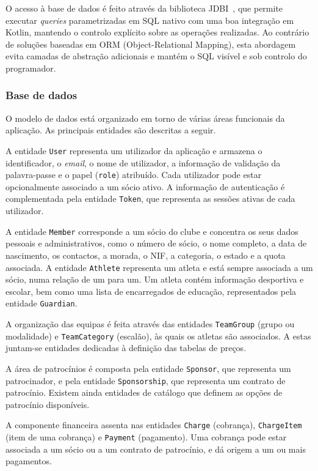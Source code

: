 O acesso à base de dados é feito através da biblioteca JDBI~\cite{jdbi}, que 
permite executar \textit{queries} parametrizadas em SQL nativo com uma boa 
integração em Kotlin, mantendo o controlo explícito sobre as operações 
realizadas. Ao contrário de soluções baseadas em ORM (Object-Relational Mapping), esta abordagem evita 
camadas de abstração adicionais e mantém o SQL visível e sob controlo do 
programador.

\subsubsection*{Base de dados}

O modelo de dados está organizado em torno de várias áreas funcionais da 
aplicação. As principais entidades são descritas a seguir.

A entidade \texttt{User} representa um utilizador da aplicação e armazena o 
identificador, o \textit{email}, o nome de utilizador, a informação de 
validação da palavra-passe e o papel (\texttt{role}) atribuído. Cada 
utilizador pode estar opcionalmente associado a um sócio ativo. A informação 
de autenticação é complementada pela entidade \texttt{Token}, que representa 
as sessões ativas de cada utilizador.

A entidade \texttt{Member} corresponde a um sócio do clube e concentra os seus 
dados pessoais e administrativos, como o número de sócio, o nome completo, a 
data de nascimento, os contactos, a morada, o NIF, a categoria, o estado e a 
quota associada. A entidade \texttt{Athlete} representa um atleta e está sempre 
associada a um sócio, numa relação de um para um. Um atleta contém informação 
desportiva e escolar, bem como uma lista de encarregados de educação, 
representados pela entidade \texttt{Guardian}.

A organização das equipas é feita através das entidades \texttt{TeamGroup} 
(grupo ou modalidade) e \texttt{TeamCategory} (escalão), às quais os atletas 
são associados. A estas juntam-se entidades dedicadas à definição das tabelas 
de preços.

A área de patrocínios é composta pela entidade \texttt{Sponsor}, que representa 
um patrocinador, e pela entidade \texttt{Sponsorship}, que representa um 
contrato de patrocínio. Existem ainda entidades de catálogo que definem as 
opções de patrocínio disponíveis.

A componente financeira assenta nas entidades \texttt{Charge} (cobrança), 
\texttt{ChargeItem} (item de uma cobrança) e \texttt{Payment} (pagamento). Uma 
cobrança pode estar associada a um sócio ou a um contrato de patrocínio, e dá 
origem a um ou mais pagamentos.


